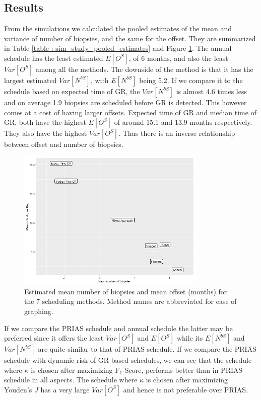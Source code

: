 \subsection{Results}
From the simulations we calculated the pooled estimates of the mean and variance of number of biopsies, and the same for the offset. They are summarized in Table \ref{table : sim_study_pooled_estimates} and Figure \ref{fig : meanNbVsOffset}. The annual schedule has the least estimated $E[O^S]$, of 6 months, and also the least $Var[O^S]$ among all the methods. The downside of the method is that it has the largest estimated $Var[N^{bS}]$, with $E[N^{bS}]$ being 5.2. If we compare it to the schedule based on expected time of GR, the $Var[N^{bS}]$ is almost 4.6 times less and on average 1.9 biopsies are scheduled before GR is detected. This however comes at a cost of having larger offsets. Expected time of GR and median time of GR, both have the highest $E[O^S]$ of around 15.1 and 13.9 months respectively. They also have the highest $Var[O^S]$. Thus there is an inverse relationship between offset and number of biopsies.\\

\begin{figure}[!htb]
	\centering
    \captionsetup{justification=centering}
	\includegraphics[width=0.8\textwidth]{images/sim_study/meanNbVsOffset.png}
	\caption{Estimated mean number of biopsies and mean offset (months) for the 7 scheduling methods. Method names are abbreviated for ease of graphing.}
	\label{fig : meanNbVsOffset}
\end{figure}

If we compare the PRIAS schedule and annual schedule the latter may be preferred since it offers the least $Var[O^S]$ and $E[O^S]$ while its $E[N^{bS}]$ and $Var[N^{bS}]$ are quite similar to that of PRIAS schedule. If we compare the PRIAS schedule with dynamic risk of GR based schedules, we can see that the schedule where $\kappa$ is chosen after maximizing $\text{F}_1$-Score, performs better than in PRIAS schedule in all aspects. The schedule where $\kappa$ is chosen after maximizing Youden's $J$ has a very large $Var[O^S]$ and hence is not preferable over PRIAS.

